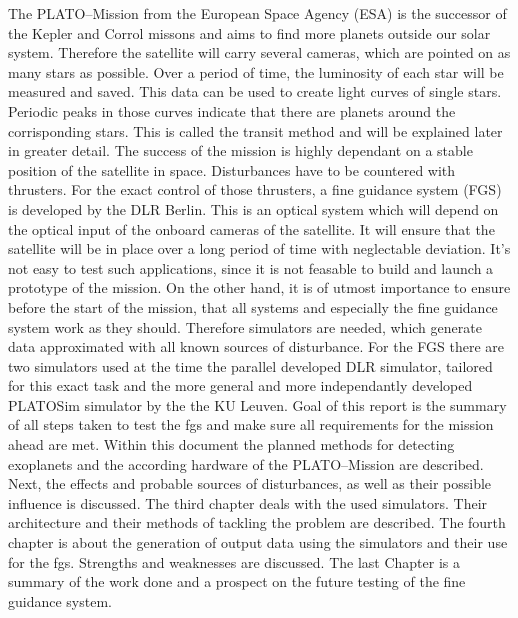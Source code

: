 The PLATO--Mission from the European Space Agency (ESA) is the successor of the Kepler and Corrol missons and aims to find more planets outside our solar system. Therefore the satellite will carry several cameras, which are pointed on as many stars as possible. Over a period of time, the luminosity of each star will be measured and saved. This data can be used to create light curves of single stars. Periodic peaks in those curves indicate that there are planets around the corrisponding stars. This is called the transit method and will be explained later in greater detail. 
\newline 
The success of the mission is highly dependant on a stable position of the satellite in space. Disturbances have to be countered with thrusters. For the exact control of those thrusters, a fine guidance system (FGS) is developed by the DLR Berlin. This is an optical system which will depend on the optical input of the onboard cameras of the satellite. It will ensure that the satellite will be in place over a long period of time with neglectable deviation. 
\newline 
It's not easy to test such applications, since it is not feasable to build and launch a prototype of the mission. On the other hand, it is of utmost importance to ensure before the start of the mission, that all systems and especially the fine guidance system work as they should. Therefore simulators are needed, which generate data approximated with all known sources of disturbance. For the FGS there are two simulators used at the time the parallel developed DLR simulator, tailored for this exact task and the more general and more independantly developed PLATOSim simulator by the the KU Leuven.
\newline
Goal of this report is the summary of all steps taken to test the fgs and make sure all requirements for the mission ahead are met. Within this document the planned methods for detecting exoplanets and the according hardware of the PLATO--Mission are described. Next, the effects and probable sources of disturbances, as well as their possible influence is discussed. The third chapter deals with the used simulators. Their architecture and their methods of tackling the problem are described. The fourth chapter is about the generation of output data using the simulators and their use for the fgs. Strengths and weaknesses are discussed. The last Chapter is a summary of the work done and a prospect on the future testing of the fine guidance system.